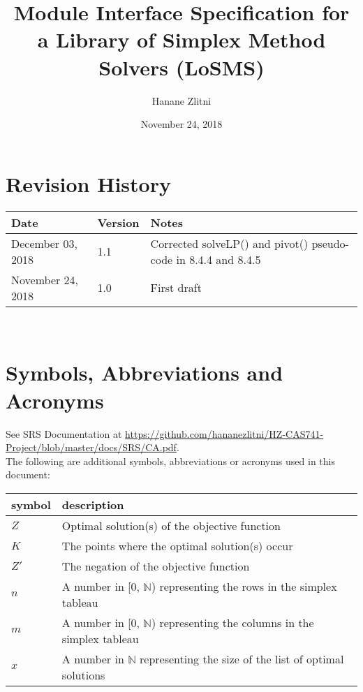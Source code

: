 \documentclass[12pt, titlepage]{article}
\newcommand{\progname}{Library of Simplex Method Solvers}
\newcommand{\famname}{LoSMS}
\begin{document}
\title{Module Interface Specification for a \progname{} (\famname{})}

\author{Hanane Zlitni}

\date{November 24, 2018}

\maketitle


\section{Revision History}

\begin{tabularx}{\textwidth}{p{3cm}p{2cm}X}
\toprule {\bf Date} & {\bf Version} & {\bf Notes}\\
\midrule
December 03, 2018 & 1.1 & Corrected solveLP() and pivot() pseudo-code in 8.4.4 
and 8.4.5\\
November 24, 2018 & 1.0 & First draft\\
\bottomrule
\end{tabularx}

~\newpage

\section{Symbols, Abbreviations and Acronyms}

See SRS Documentation at 
\url{https://github.com/hananezlitni/HZ-CAS741-Project/blob/master/docs/SRS/CA.pdf}.
 \\

The following are additional symbols, abbreviations or acronyms used in this 
document: \\

\renewcommand{\arraystretch}{1.2}
\begin{tabular}{l l} 
	\toprule		
	\textbf{symbol} & \textbf{description}\\
	\midrule 
	$Z$ & Optimal solution(s) of the objective function\\
	$K$ & The points where the optimal solution(s) occur\\
	$Z'$ & The negation of the objective function\\
	$n$ & A number in [0, $\mathbb{N}$) representing the rows in the simplex 
	tableau \\
	$m$ & A number in [0, $\mathbb{N}$) representing the columns in the 
	simplex tableau \\
	$x$ & A number in $\mathbb{N}$ representing the size of the list of 
	optimal solutions \\
	\bottomrule
\end{tabular}\\
\end{document}
